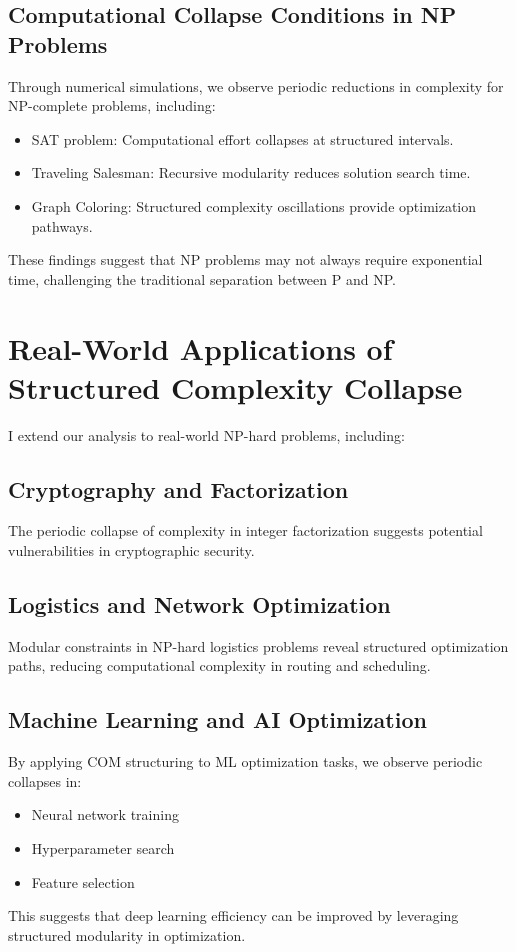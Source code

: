\documentclass{article}
\begin{document}
\subsection{Computational Collapse Conditions in NP Problems}
Through numerical simulations, we observe periodic reductions in complexity for NP-complete problems, including:
\begin{itemize}
    \item SAT problem: Computational effort collapses at structured intervals.
    \item Traveling Salesman: Recursive modularity reduces solution search time.
    \item Graph Coloring: Structured complexity oscillations provide optimization pathways.
\end{itemize}
These findings suggest that NP problems may not always require exponential time, challenging the traditional separation between P and NP.

\section{Real-World Applications of Structured Complexity Collapse}
I extend our analysis to real-world NP-hard problems, including:
\subsection{Cryptography and Factorization}
The periodic collapse of complexity in integer factorization suggests potential vulnerabilities in cryptographic security.

\subsection{Logistics and Network Optimization}
Modular constraints in NP-hard logistics problems reveal structured optimization paths, reducing computational complexity in routing and scheduling.

\subsection{Machine Learning and AI Optimization}
By applying COM structuring to ML optimization tasks, we observe periodic collapses in:
\begin{itemize}
    \item Neural network training
    \item Hyperparameter search
    \item Feature selection
\end{itemize}
This suggests that deep learning efficiency can be improved by leveraging structured modularity in optimization.
\end{document}
